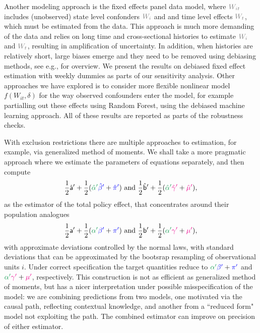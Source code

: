 \documentclass[11pt,reqno,letter]{amsart}
\theoremstyle{definition}
\def\bcolor{\color{ForestGreen}}
\def\pcolor{\color{blue}}
\def\icolor{\color{magenta}}
\def\wcolor{\color{gray}}
\begin{document}
Another modeling approach is the fixed effects panel data model, where ${\wcolor W_{it}}$ includes
 (unobserved) state level confonders ${\wcolor W_i}$ and  and time level effects ${\wcolor W_t}$,
which must be estimated from the data.  This approach is much more demanding of the data and relies on long time and cross-sectional histories to estimate ${\wcolor W_i}$ and ${\wcolor W_t}$, resulting in amplification of uncertainty. In addition, when histories are relatively short,  large biases emerge and they need to be removed using debiasing methods, see e.g., \cite{chen2019mastering} for overview. We present the results
on debiased fixed effect estimation with weekly dummies as parts of our sensitivity analysis. Other approaches we have explored
is to consider more flexible nonlinear model $f(W_{it}, \delta)$ for the way observed confounders enter the model,
for example partialling out these effects using Random Forest, using the debiased machine learning approach.
All of these results are reported as parts of the robustness checks.



With exclusion restrictions there are multiple approaches to estimation, for example,
via generalized method of moments. We shall take a more pragmatic approach where we estimate
the parameters of equations separately, and then compute
\[
 \frac{1}{2} \hat {\mathsf{a}}'  + \frac{1}{2}  ( {\bcolor \hat \alpha '}  {\pcolor \hat \beta' }+{\pcolor\hat \pi'} ) \text{ and }
 \frac{1}{2} \hat{\mathsf{b}}'  + \frac{1}{2}  ( {\bcolor \hat \alpha '}  {\icolor \hat \gamma'} + {\icolor \hat \mu'}),
\]
as the estimator of the total policy effect, that concentrates around  their population analogues
\[
 \frac{1}{2}  {\mathsf{a}}'  + \frac{1}{2}  ( {\bcolor \alpha '}  {\pcolor \beta' }+{\pcolor \pi'} ) \text{ and }
 \frac{1}{2} {\mathsf{b}}'  + \frac{1}{2}  ( {\bcolor  \alpha '}  {\icolor \gamma'} + {\icolor \mu'}),
\]
with approximate deviations controlled by the normal laws, with standard deviations that can be approximated by the bootsrap
resampling of observational units $i$. Under correct specification the target quantities
reduce to $  {\bcolor \alpha '}  {\pcolor  \beta' }+{\pcolor \pi'} $ and ${\bcolor  \alpha '}  {\icolor  \gamma'} + {\icolor  \mu'}$, respectively. This construction is not as efficient as generalized method of moments,
but has a nicer interpretation under possible misspecification of the model: we are combining predictions
from two models, one motivated via the causal path, reflecting contextual knowledge, and another from a ``reduced form" model not exploiting the path. The combined estimator can improve on precision of either estimator.
\end{document}
